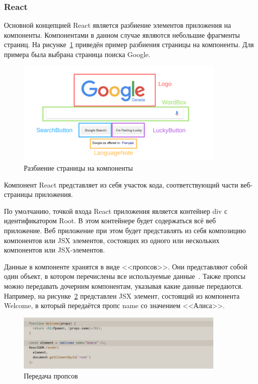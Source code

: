 \subsubsection{React}

Основной концепцией React является разбиение элементов приложения на компоненты. Компонентами в данном случае являются небольшие фрагменты страниц. На рисунке~\ref{img:react__components} приведён пример разбиения страницы на компоненты. Для примера была выбрана страница поиска Google.

\begin{figure}[H]
  \centering
  \includegraphics[width=0.9\textwidth]{assets/images/theoretical2/components.png}
  \caption{Разбиение страницы на компоненты}
  \label{img:react__components}
\end{figure}

Компонент React представляет из себя участок кода, соответствующий части веб-страницы приложения.

По умолчанию, точкой входа React приложения является контейнер div с идентификатором Root. В этом контейнере будет содержаться всё веб приложение. Веб приложение при этом будет представлять из себя композицию компонентов или JSX элементов, состоящих из одного или нескольких компонентов или JSX-элементов.

Данные в компоненте хранятся в виде <<пропсов>>. Они представляют собой один объект, в котором перечислены все используемые данные~\cite{react}. Также пропсы можно передавать дочерним компонентам, указывая какие данные передаются. Например, на рисунке~\ref{img:react__props} представлен JSX элемент, состоящий из компонента Welcome, в который передаётся пропс name со значением <<Алиса>>.

\begin{figure}[H]
  \centering
  \includegraphics[width=0.9\textwidth]{assets/images/theoretical2/props.png}
  \caption{Передача пропсов}
  \label{img:react__props}
\end{figure}

